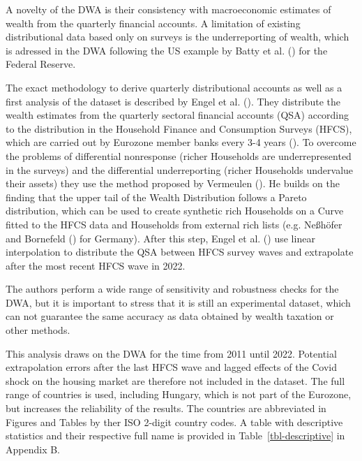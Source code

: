 \documentclass[
  a4paper,
  DIV=11,
  numbers=noendperiod]{scrartcl}
\begin{document}
A novelty of the DWA is their consistency with macroeconomic estimates
of wealth from the quarterly financial accounts. A limitation of
existing distributional data based only on surveys is the underreporting
of wealth, which is adressed in the DWA following the US example by
Batty et al.
() for the
Federal Reserve.

The exact methodology to derive quarterly distributional accounts as
well as a first analysis of the dataset is described by Engel et al.
(). They
distribute the wealth estimates from the quarterly sectoral financial
accounts (QSA) according to the distribution in the Household Finance
and Consumption Surveys (HFCS), which are carried out by Eurozone member
banks every 3-4 years
(). To
overcome the problems of differential nonresponse (richer Households are
underrepresented in the surveys) and the differential underreporting
(richer Households undervalue their assets) they use the method proposed
by Vermeulen (). He
builds on the finding that the upper tail of the Wealth Distribution
follows a Pareto distribution, which can be used to create synthetic
rich Households on a Curve fitted to the HFCS data and Households from
external rich lists (e.g. Neßhöfer and Bornefeld
() for
Germany). After this step, Engel et al.
() use linear
interpolation to distribute the QSA between HFCS survey waves and
extrapolate after the most recent HFCS wave in 2022.

The authors perform a wide range of sensitivity and robustness checks
for the DWA, but it is important to stress that it is still an
experimental dataset, which can not guarantee the same accuracy as data
obtained by wealth taxation or other methods.

This analysis draws on the DWA for the time from 2011 until 2022.
Potential extrapolation errors after the last HFCS wave and lagged
effects of the Covid shock on the housing market are therefore not
included in the dataset. The full range of countries is used, including
Hungary, which is not part of the Eurozone, but increases the
reliability of the results. The countries are abbreviated in Figures and
Tables by ther ISO 2-digit country codes. A table with descriptive
statistics and their respective full name is provided in
Table~\ref{tbl-descriptive} in Appendix B.
\end{document}
